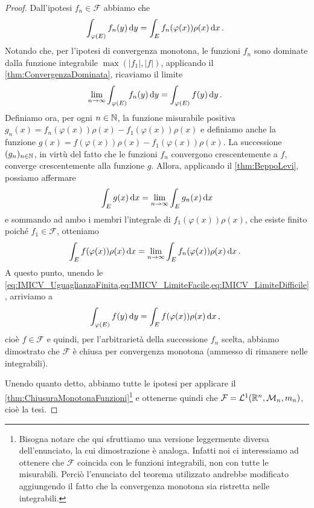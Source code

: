 \begin{proof}
	Dall'ipotesi $f_n\in\mathcal F$ abbiamo che
	\begin{equation}\label{eq:IMICV_UguaglianzaFinita}
		\int_{\varphi(E)} f_n(y)\,\mathrm d y = \int_E f_n(\varphi(x))\rho(x)\,\mathrm d x\, \text{. }
	\end{equation}
	Notando che, per l'ipotesi di convergenza monotona, le funzioni $f_n$ sono dominate dalla funzione integrabile $\max(|f_1|,|f|)$, applicando il \cref{thm:ConvergenzaDominata}, ricaviamo il limite
	\begin{equation}\label{eq:IMICV_LimiteFacile}
		\lim_{n\to\infty} \int_{\varphi(E)} f_n(y)\,\mathrm d y = \int_{\varphi(E)} f(y) \,\mathrm d y\, \text{. }
	\end{equation}
	Definiamo ora, per ogni $n\in\mathbb N$, la funzione misurabile positiva $g_n(x)=f_n(\varphi(x))\rho(x)-f_1(\varphi(x))\rho(x)$ e definiamo anche la funzione $g(x)=f(\varphi(x))\rho(x)-f_1(\varphi(x))\rho(x)$.
	La successione $(g_n)_{n\in\mathbb N}$, in virtù del fatto che le funzioni $f_n$ convergono crescentemente a $f$, converge crescentemente alla funzione $g$.
	Allora, applicando il \cref{thm:BeppoLevi}, possiamo affermare
	\begin{equation*}
		\int_E g(x)\,\mathrm d x=\lim_{n\to\infty} \int_E g_n(x)\,\mathrm d x
	\end{equation*}
	e sommando ad ambo i membri l'integrale di $f_1(\varphi(x))\rho(x)$, che esiste finito poiché $f_1\in\mathcal F$, otteniamo
	\begin{equation}\label{eq:IMICV_LimiteDifficile}
		\int_E f(\varphi(x))\rho(x)\,\mathrm d x=\lim_{n\to\infty} \int_E f_n(\varphi(x))\rho(x)\,\mathrm d x \, \text{. }
	\end{equation}
	A questo punto, unendo le \cref{eq:IMICV_UguaglianzaFinita,eq:IMICV_LimiteFacile,eq:IMICV_LimiteDifficile}, arriviamo a
	\begin{equation*}
		\int_{\varphi(E)} f(y)\,\mathrm d y=\int_E f(\varphi(x))\rho(x)\,\mathrm d x\, \text{, }
	\end{equation*}
	cioè $f\in\mathcal F$ e quindi, per l'arbitrarietà della successione $f_n$ scelta, abbiamo dimostrato che $\mathcal F$ è chiusa per convergenza monotona (ammesso di rimanere nelle integrabili).
	
	Unendo quanto detto, abbiamo tutte le ipotesi per applicare il \cref{thm:ChiusuraMonotonaFunzioni}\footnote{Bisogna notare che qui sfruttiamo una versione leggermente diversa dell'enunciato, la cui dimostrazione è analoga. Infatti noi ci interessiamo ad ottenere che $\mathcal F$ coincida con le funzioni integrabili, non con tutte le misurabili. 
	Perciò l'enunciato del teorema utilizzato andrebbe modificato aggiungendo il fatto che la convergenza monotona sia ristretta nelle integrabili.} e ottenerne quindi che $\mathcal F=\mathcal L^1(\mathbb R^n,\mathcal M_n,m_n)$, cioè la tesi.
\end{proof}

